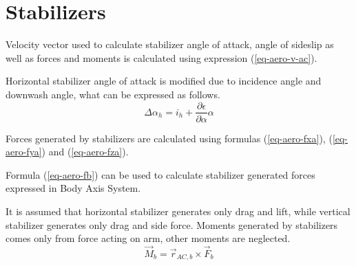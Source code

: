 \section{Stabilizers}

Velocity vector used to calculate stabilizer angle of attack, angle of sideslip as well as forces and moments is calculated using expression (\ref{eq-aero-v-ac}).

Horizontal stabilizer angle of attack is modified due to incidence angle and downwash angle, what can be expressed as follows. \cite{Etkin1972}
\begin{equation}
  \Delta \alpha_h
  =
  i_h + \frac{ \partial \epsilon }{ \partial \alpha } \alpha
\end{equation}

Forces generated by stabilizers are calculated using formulas (\ref{eq-aero-fxa}), (\ref{eq-aero-fya}) and (\ref{eq-aero-fza}).

Formula (\ref{eq-aero-fb}) can be used to calculate stabilizer generated forces expressed in Body Axis System.

It is assumed that horizontal stabilizer generates only drag and lift, while vertical stabilizer generates only drag and side force. Moments generated by stabilizers comes only from force acting on arm, other moments are neglected.
\begin{equation}
  {\vec M}_b = {\vec r}_{AC,b} \times {\vec F}_b
\end{equation}
